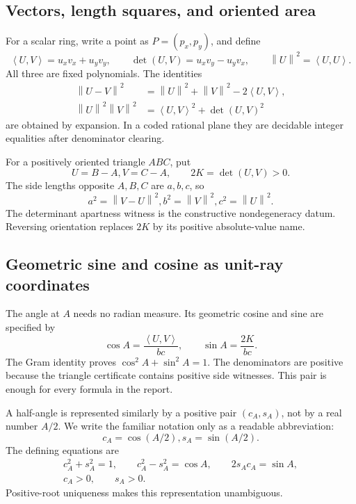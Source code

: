 \documentclass[11pt,letterpaper]{article}
\theoremstyle{definition}
\theoremstyle{remark}
\newcommand{\norm}[1]{\left\lVert #1\right\rVert}
\newcommand{\ip}[2]{\left\langle #1,#2\right\rangle}
\newcommand{\detm}[2]{\det\!\left(#1,#2\right)}
\begin{document}
\subsection{Vectors, length squares, and oriented area}

For a scalar ring, write a point as \(P=(p_x,p_y)\), and define
\[
 \ip{U}{V}=u_xv_x+u_yv_y,
 \qquad
 \detm{U}{V}=u_xv_y-u_yv_x,
 \qquad
 \norm U^2=\ip U U.
\]
All three are fixed polynomials.  The identities
\begin{align}
 \norm{U-V}^2&=\norm U^2+\norm V^2-2\ip U V,
 \tag{2.1}\label{eq:cos-poly}\\
 \norm U^2\norm V^2&=\ip U V^2+\detm U V^2
 \tag{2.2}\label{eq:gram}
\end{align}
are obtained by expansion.  In a coded rational plane they are decidable
integer equalities after denominator clearing.

For a positively oriented triangle \(ABC\), put
\[
 U=B-A,
 V=C-A,
 \qquad 2K=\detm U V>0.
\]
The side lengths opposite \(A,B,C\) are \(a,b,c\), so
\[
 a^2=\norm{V-U}^2,
 b^2=\norm V^2,
 c^2=\norm U^2.
\]
The determinant apartness witness is the constructive nondegeneracy datum.
Reversing orientation replaces \(2K\) by its positive absolute-value name.

\subsection{Geometric sine and cosine as unit-ray coordinates}

The angle at \(A\) needs no radian measure.  Its geometric cosine and sine are
specified by
\[
  \cos A=\frac{\ip U V}{bc},
  \qquad
  \sin A=\frac{2K}{bc}.
\]
The Gram identity proves \(\cos^2A+\sin^2A=1\).  The denominators are positive
because the triangle certificate contains positive side witnesses.  This pair
is enough for every formula in the report.

A half-angle is represented similarly by a positive pair
\((c_A,s_A)\), not by a real number \(A/2\).  We write the familiar notation
only as a readable abbreviation:
\[
  c_A=\cos(A/2),
 s_A=\sin(A/2).
\]
The defining equations are
\begin{equation}
\begin{gathered}
 c_A^2+s_A^2=1,\qquad
 c_A^2-s_A^2=\cos A,\qquad
 2s_Ac_A=\sin A,\\
 c_A>0,\qquad s_A>0.
\end{gathered}
\tag{2.3}\label{eq:half-angle-characterization}
\end{equation}
Positive-root uniqueness makes this representation unambiguous.
\end{document}
